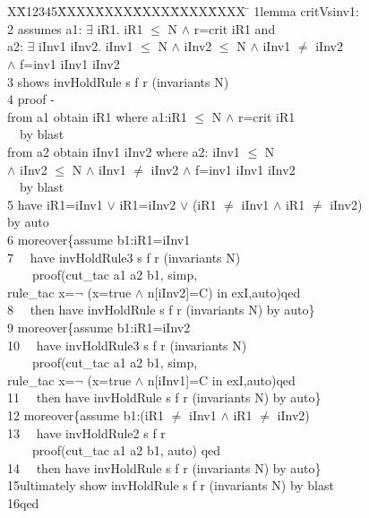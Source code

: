 \documentclass[final]{IEEEtran}
\newlength{\fminilength}
\newenvironment{fmini}[1][\linewidth]
  {\setlength{\fminilength}{#1\fboxsep-2\fboxrule}%
   \vspace{2ex}\noindent\begin{lrbox}{\fminibox}\begin{minipage}{\fminilength}%
   \mbox{ }\hfill\vspace{-2.5ex}}%
  {\end{minipage}\end{lrbox}\vspace{1ex}\hspace{0ex}%
   \framebox{\usebox{\fminibox}}}
\newenvironment{specification}
{\noindent\scriptsize
\tt\begin{fmini}\begin{tabbing}X\=X12345\=XXXX\=XXXX\=XXXX\=XXXX\=XXXX
\=\+\kill} {\end{tabbing}\normalfont\end{fmini}}
\def \twoSpaces {\ \ }
\def \andc {\wedge }
\def \negc {\lnot}
\def \iInv {iInv}
\def \iR {iR}
\begin{document}
\begin{specification}
1lemma critVsinv1:\\
2  assumes  a1: $\exists$ \iR1. \iR1 $\le$ N $\wedge$ r=crit \iR1 and \\
  a2: $\exists$  \iInv1 \iInv2. \iInv1 $\le$ N $\wedge$ \iInv2 $\le$ N $\wedge$ \iInv1 $\neq$ \iInv2 \\
   $\wedge$ f=inv1  \iInv1 \iInv2\\
3  shows  invHoldRule s f r (invariants
  N)\\
4  proof -\\
   from a1 obtain \iR1 where a1:\iR1 $\le$ N $\wedge$ r=crit \iR1 \\
\twoSpaces   by blast\\
   from a2 obtain \iInv1 \iInv2 where a2: \iInv1 $\le$ N \\
   $\wedge$ \iInv2 $\le$ N $\wedge$ \iInv1 $\neq$ \iInv2 $\wedge$ f=inv1  \iInv1 \iInv2\\
\twoSpaces   by blast \\
5  have iR1=\iInv1 $\vee$ \iR1=\iInv2 $\vee$ (\iR1 $\ne$ \iInv1 $\wedge$  \iR1 $\ne$ \iInv2) \\
  by auto\\

6  moreover\{assume  b1:\iR1=\iInv1\\
7  \twoSpaces have invHoldRule3 s f r (invariants N)\\
 \twoSpaces  \twoSpaces   proof(cut\_tac a1 a2 b1, simp, \\
 rule\_tac x=$\negc$ (x=true $\andc$ n[\iInv2]=C)  in exI,auto)qed\\
8  \twoSpaces then have invHoldRule s f r
(invariants
  N)
by auto\}\\

9  moreover\{assume  b1:iR1=\iInv2\\
10 \twoSpaces have invHoldRule3 s f r (invariants N)\\
 \twoSpaces \twoSpaces   proof(cut\_tac a1 a2 b1, simp, \\
 rule\_tac x=$\negc$ (x=true $\andc$ n[\iInv1]=C  in exI,auto)qed\\
11 \twoSpaces then have invHoldRule s f r (invariants
  N)
by auto\}\\

12   moreover\{assume  b1:(\iR1 $\ne$  \iInv1 $\wedge$   \iR1 $\ne$  \iInv2)\\
13 \twoSpaces have invHoldRule2 s f r  \\
  \twoSpaces \twoSpaces  proof(cut\_tac a1 a2 b1,  auto) qed\\
14 \twoSpaces then have invHoldRule s f r
(invariants
  N)
by auto\} \\

15ultimately show invHoldRule s f r
(invariants N) by blast\\
16qed\\
\end{specification}
\end{document}
